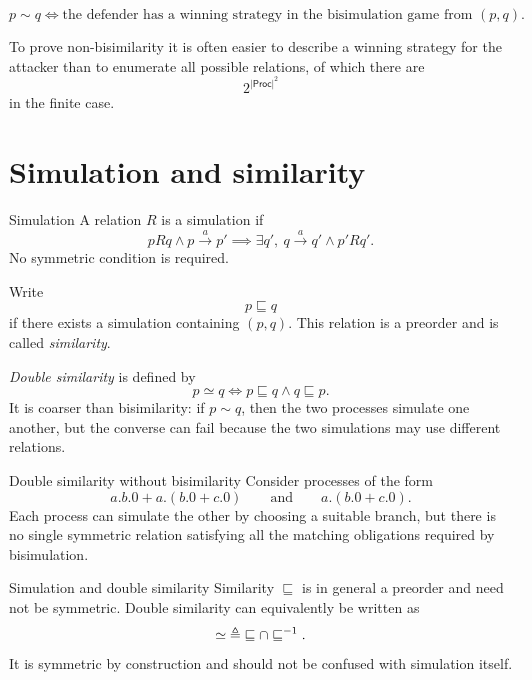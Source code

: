 \documentclass[a4paper]{article}
\newcommand{\Proc}{\mathsf{Proc}}
\newcommand{\trans}[1]{\xrightarrow{#1}}
\begin{document}
\begin{snippettheorem}{}
    \[
        p\sim q
        \iff
        \text{the defender has a winning strategy in the bisimulation game from \((p,q)\)}.
    \]
\end{snippettheorem}

To prove non-bisimilarity it is often easier to describe a winning strategy for the attacker than to enumerate all possible relations, of which there are
\[
    2^{|\Proc|^2}
\]
in the finite case.

\section{Simulation and similarity}

\begin{snippetdefinition}{Simulation}
    A relation \(R\) is a simulation if
    \[
        pRq
        \land
        p\trans{a}p'
        \implies
        \exists q',\ q\trans{a}q'\land p'Rq'.
    \]
    No symmetric condition is required.
\end{snippetdefinition}

Write
\[
    p\sqsubseteq q
\]
if there exists a simulation containing \((p,q)\).
This relation is a preorder and is called \emph{similarity}.

\emph{Double similarity} is defined by
\[
    p\simeq q
    \iff
    p\sqsubseteq q
    \land
    q\sqsubseteq p.
\]
It is coarser than bisimilarity: if \(p\sim q\), then the two processes simulate one another, but the converse can fail because the two simulations may use different relations.

\begin{snippetexample}{Double similarity without bisimilarity}
    Consider processes of the form
    \[
        a.b.0+a.(b.0+c.0)
        \qquad\text{and}\qquad
        a.(b.0+c.0).
    \]
    Each process can simulate the other by choosing a suitable branch, but there is no single symmetric relation satisfying all the matching obligations required by bisimulation.
\end{snippetexample}

\begin{snippetexample}{Simulation and double similarity}
    Similarity \(\sqsubseteq\) is in general a preorder and need not be symmetric.
    Double similarity can equivalently be written as
    \[
        \simeq\;\triangleq\;\sqsubseteq\cap\sqsubseteq^{-1}.
    \]
    It is symmetric by construction and should not be confused with simulation itself.
\end{snippetexample}
\end{document}
